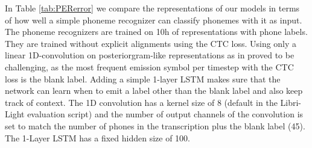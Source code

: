 \documentclass[a4paper]{article}
\begin{document}
\begin{table}[th]
  \caption{PER error for training a very simple phoneme recognizer with 10h of data on: PLP features, CPC model features or Sparsespeech model features.}
  \label{tab:PERerror}
  \centering
\end{table}



In Table \ref{tab:PERerror} we compare the representations of our models in terms of how well a simple phoneme recognizer can classify phonemes with it as input. The phoneme recognizers are trained on 10h of representations with phone labels. They are trained without explicit alignments using the CTC loss. Using only a linear 1D-convolution on posteriorgram-like representations as in \cite{kahn2019libri} proved to be challenging, as the most frequent emission symbol per timestep with the CTC loss is the blank label. Adding a simple 1-layer LSTM makes sure that the network can learn when to emit a label other than the blank label and also keep track of context. The 1D convolution has a kernel size of 8 (default in the Libri-Light evaluation script) and the number of output channels of the convolution is set to match the number of phones in the transcription plus the blank label (45). The 1-Layer LSTM has a fixed hidden size of 100. 
\end{document}
